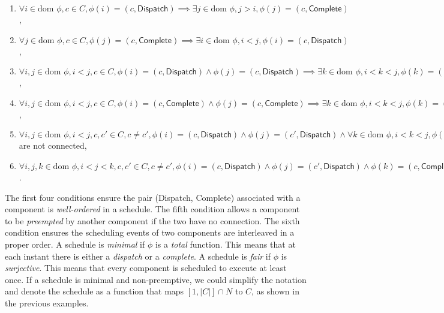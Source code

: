 \begin{enumerate}
	\item $ \forall i \in \text{dom }\phi, c\in C, \phi(i) = (c, \textsf{Dispatch}) \implies \exists j\in \text{dom }\phi, j > i, \phi(j) =  (c, \textsf{Complete}) $,
	\item $ \forall j \in \text{dom }\phi, c\in C, \phi(j) = (c, \textsf{Complete}) \implies \exists i\in \text{dom }\phi, i < j, \phi(i) =  (c, \textsf{Dispatch}) $,
	\item $ \forall i, j \in \text{dom }\phi, i < j, c\in C,  \phi(i) = (c, \textsf{Dispatch}) \wedge \phi(j) = (c, \textsf{Dispatch}) \implies \exists k\in \text{dom }\phi, i < k < j, \phi(k) =  (c, \textsf{Complete}) $,
	\item $ \forall i, j \in \text{dom }\phi, i < j, c\in C,  \phi(i) = (c, \textsf{Complete}) \wedge \phi(j) = (c, \textsf{Complete}) \implies \exists k\in \text{dom }\phi, i < k < j, \phi(k) =  (c, \textsf{Dispatch}) $,
	\item $ \forall i, j \in \text{dom }\phi, i < j, c, c'\in C, c \neq c', \phi(i) = (c, \textsf{Dispatch}) \wedge \phi(j) = (c', \textsf{Dispatch}) \wedge \forall k \in \text{dom }\phi, i < k <j, \phi(k) \neq (c,
 \textsf{Complete}) \implies c, c'$ are not connected,
	\item $ \forall i, j, k \in \text{dom }\phi, i < j < k, c, c'\in C, c \neq c', \phi(i) = (c, \textsf{Dispatch}) \wedge \phi(j) = (c', \textsf{Dispatch}) \wedge \phi(k) = (c, \textsf{Complete}) \implies \exists n \in \text{dom }\phi, j < n < k, \phi(n) = (c', \textsf{Complete}) $.
\end{enumerate}

The first four conditions ensure the pair (\textsf{Dispatch}, \textsf{Complete}) associated with a component is \emph{well-ordered} in a schedule. 
The fifth condition allows a component to be \emph{preempted} by another component if the two have no connection. The sixth condition ensures the scheduling events of two components are interleaved in a proper order.
A schedule is \emph{minimal} if $\phi$ is a \emph{total} function. This means that at each instant there is either a \emph{dispatch} or a \emph{complete}. 
A schedule is \emph{fair} if $\phi$ is \emph{surjective}. This means that every component is scheduled to execute at least once.
If a schedule is minimal and non-preemptive, we could simplify the notation and denote the schedule as a function that maps $[1, |C|] \cap N$ to $C$, as shown in the previous examples.

